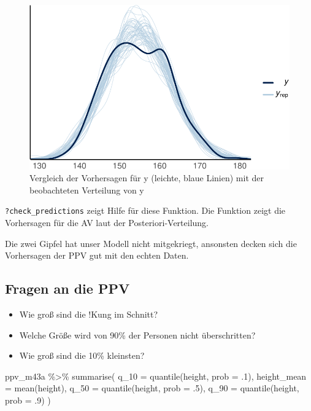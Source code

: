 \documentclass[
  a4paper,
  DIV=11]{scrreprt}
\newenvironment{Shaded}{\begin{snugshade}}{\end{snugshade}}
\newcommand{\AttributeTok}[1]{\textcolor[rgb]{0.40,0.45,0.13}{#1}}
\newcommand{\DecValTok}[1]{\textcolor[rgb]{0.68,0.00,0.00}{#1}}
\newcommand{\FunctionTok}[1]{\textcolor[rgb]{0.28,0.35,0.67}{#1}}
\newcommand{\NormalTok}[1]{\textcolor[rgb]{0.00,0.23,0.31}{#1}}
\newcommand{\SpecialCharTok}[1]{\textcolor[rgb]{0.37,0.37,0.37}{#1}}
\providecommand{\tightlist}{%
  \setlength{\itemsep}{0pt}\setlength{\parskip}{0pt}}\usepackage{longtable,booktabs,array}
\theoremstyle{definition}
\theoremstyle{remark}
\begin{document}
\begin{figure}[H]

{\centering \includegraphics{./lineare-modelle_files/figure-pdf/fig-ppv-check-1.pdf}

}

\caption{\label{fig-ppv-check}Vergleich der Vorhersagen für y (leichte,
blaue Linien) mit der beobachteten Verteilung von y}

\end{figure}

\texttt{?check\_predictions} zeigt Hilfe für diese Funktion. Die
Funktion zeigt die Vorhersagen für die AV laut der
Posteriori-Verteilung.

Die zwei Gipfel hat unser Modell nicht mitgekriegt, ansonsten decken
sich die Vorhersagen der PPV gut mit den echten Daten.

\hypertarget{fragen-an-die-ppv}{%
\subsection{Fragen an die PPV}\label{fragen-an-die-ppv}}

\begin{itemize}
\tightlist
\item
  Wie groß sind die !Kung im Schnitt?
\item
  Welche Größe wird von 90\% der Personen nicht überschritten?
\item
  Wie groß sind die 10\% kleinsten?
\end{itemize}

\begin{Shaded}
\begin{Highlighting}[]
\NormalTok{ppv\_m43a }\SpecialCharTok{\%\textgreater{}\%} 
  \FunctionTok{summarise}\NormalTok{(}
    \AttributeTok{q\_10 =} \FunctionTok{quantile}\NormalTok{(height, }\AttributeTok{prob =}\NormalTok{ .}\DecValTok{1}\NormalTok{),}
    \AttributeTok{height\_mean =} \FunctionTok{mean}\NormalTok{(height),}
    \AttributeTok{q\_50 =} \FunctionTok{quantile}\NormalTok{(height, }\AttributeTok{prob =}\NormalTok{ .}\DecValTok{5}\NormalTok{),}
    \AttributeTok{q\_90 =} \FunctionTok{quantile}\NormalTok{(height, }\AttributeTok{prob =}\NormalTok{ .}\DecValTok{9}\NormalTok{)}
\NormalTok{  )}
\end{Highlighting}
\end{Shaded}
\end{document}
